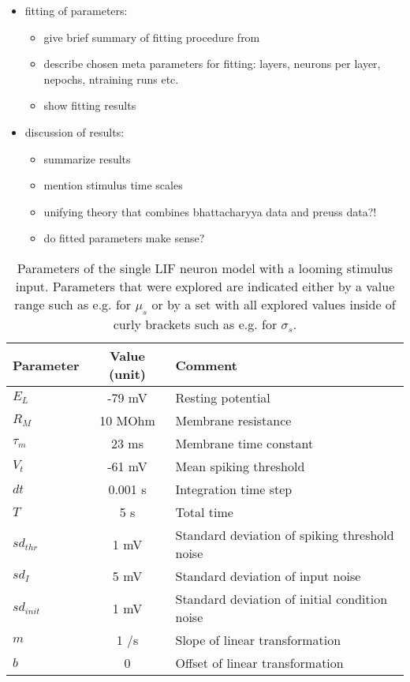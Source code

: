 \documentclass[a4paper,10pt,hidelinks]{scrreprt}
\begin{document}
\begin{itemize}
\begin{itemize}
		\end{itemize}
		\item fitting of parameters:
		\begin{itemize}
			\item give brief summary of fitting procedure from \cite{Lueckmann2018}
			\item describe chosen meta parameters for fitting: layers, neurons per layer, nepochs, 
			ntraining runs etc.
			\item show fitting results
		\end{itemize}
		\item discussion of results:
		\begin{itemize}
			\item summarize results
			\item mention stimulus time scales
			\item unifying theory that combines bhattacharyya data and preuss data?!
			\item do fitted parameters make sense?
		\end{itemize}
	\end{itemize}
	\begin{table} [!th]
		\begin{center}
			\begin{tabular}{|l|c|p{7cm}|}
				\hline
				\textbf{Parameter} & \textbf{Value (unit)} & \textbf{Comment} \\
				\hline
				$E_L$ & -79 mV & Resting potential\\
				$R_M$ & 10 MOhm & Membrane resistance\\
				$\tau_{m}$ & 23 ms & Membrane time constant\\
				$V_t$ & -61 mV & Mean spiking threshold\\
				$dt$ & 0.001 s & Integration time step\\
				$T$ & 5 s & Total time\\
				$sd_{thr}$ & 1 mV & Standard deviation of spiking threshold noise\\
				$sd_{I}$ & 5 mV & Standard deviation of input noise\\
				$sd_{init}$ & 1 mV & Standard deviation of initial condition noise\\
				$m$ & 1 \textdegree/s  & Slope of linear transformation\\
				$b$ & 0 \textdegree & Offset of linear transformation\\
				\hline
			\end{tabular}
		\end{center}
		\caption{Parameters of the single LIF neuron model with a looming stimulus input. Parameters that were explored are indicated either by a value range such as e.g. for $\mu_s$ or by a set with all explored values inside of curly brackets such as e.g. for $\sigma_s$.}
		\label{tab:neuroparams}
	\end{table}
\end{document}

